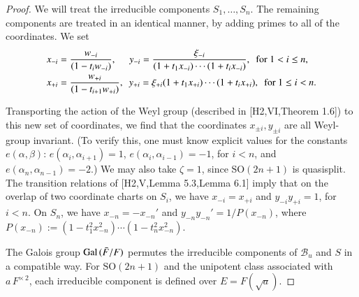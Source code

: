 \documentclass{amsart}
\def\diabox#1#2#3{#1, #2, #3}
\newcommand\Gal{\hbox{Gal\,}}
\newcommand\bF{{\bar F}}
\begin{document}
\begin{proof}

\medskip

We will treat the irreducible components $S_1,\ldots,S_n$.
The remaining components are treated in an identical manner,
by adding primes to all of the coordinates.  We set
\begin{align*}
x_{-i} &= {w_{-i}\over (1-t_i w_{-i} )},\ \ \ \ \,\,
y_{-i}  = {\xi_{-i}\over
  (1+t_1 x_{-i} )\cdots (1+t_i x_{-i} )},\ \text{ for }1<i\le n,\\
x_{+i} &= {w_{+i}\over (1-t_{i+1} w_{+i})},\ \ 
y_{+i} = {\xi_{+i} (1+t_1 x_{+i})\cdots (1+t_i x_{+i})},\ \text{ for }
 1\le i<n.\\
\end{align*}

Transporting the action of the Weyl group (described in
[H2,VI,Theorem 1.6]) to this new set of coordinates, 
we find that the coordinates $x_{\pm i}, y_{\pm i}$ are all
Weyl-group invariant.  (To verify this, one must know explicit
values for the constants $e(\alpha,\beta)$:
$e(\alpha_i,\alpha_{i+1}) = 1$, $e(\alpha_{i},\alpha_{i-1})=
-1$, for $i<n$,  and $e(\alpha_n,\alpha_{n-1}) = -2$.)
We may also take $\zeta=1$, since $\text{SO}(2n+1)$ is quasisplit.
The transition relations of
[H2,V,Lemma 5.3,Lemma 6.1] imply that on the overlap of
two coordinate charts on $S_i$, we have
$x_{-i} = x_{+i}$ and $y_{-i} y_{+i}=1$, for $i<n$.
On $S_n$, we have $x_{-n} = -x_{-n}'$ and $y_{-n} y_{-n}' = 1/P(x_{-n})$,
where $P(x_{-n}):= (1-t_1^2 x_{-n}^2)\cdots (1-t_n^2 x_{-n}^2)$.

The
Galois group $\Gal(\bF/F)$ permutes the irreducible
components of ${\mathcal B}_u$ and $S$ in a compatible way.  For
$\text{SO}(2n+1)$ and the unipotent class associated with $a\,F^{\times\,2}$,
each irreducible component is defined over $E=F(\sqrt{a})$.  


\end{proof}
\end{document}
